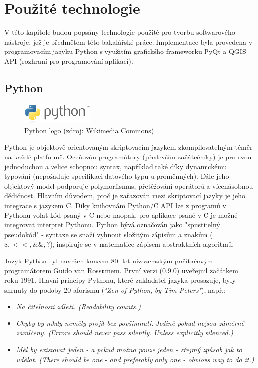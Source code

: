\chapter{Použité technologie}
\label{3-technologie}

V této kapitole budou popsány technologie použité pro tvorbu softwarového nástroje, jež je předmětem této bakalářské práce. Implementace byla provedena v programovacím jazyku Python s využitím grafického frameworku PyQt a QGIS API (rozhraní pro programování aplikací).  

\section{Python}
\begin{figure}[H]
    \centering
      \includegraphics[width=100pt]{./pictures/python.png}
      \caption[Python logo]{Python logo (zdroj: Wikimedia Commons)}
      \label{fig:python}
\end{figure}
  
Python je objektově orientovaným skriptovacím jazykem zkompilovatelným téměr na každé platformě. Oceňován programátory (především začátečníky) je pro svou jednoduchou a velice schopnou syntax, například také díky dynamickému typování (nepožaduje specifikaci datového typu u proměnných). Dále jeho objektový model podporuje polymorfismus, přetěžování operátorů a vícenásobnou dědičnost. Hlavním důvodem, proč je zařazován mezi skriptovací jazyky je jeho integrace s jazykem C. Díky knihovnám Python/C API lze z programů v Pythonu volat kód psaný v C nebo naopak, pro aplikace psané v C je možné integrovat interpret Pythonu. %
Python bývá označován jako "spustitelný pseudokód" - syntaxe se snaží vyhnout složitým zápisům a znakům ($\$, <<, \&\&, ?$), inspiruje se v matematice zápisem abstraktních algoritmů.%

Jazyk Python byl navržen koncem 80. let nizozemským počítačovým programátorem Guido van Rossumem. První verzi (0.9.0) uveřejnil začátkem roku 1991. Hlavní principy Pythonu, které zakladatel jazyka prosazuje, byly shrnuty do podoby 20 aforismů (\textit{"Zen of Python, by Tim Peters"}), např.:

\begin{itemize}

	\item
		\textit{Na čitelnosti záleží. (Readability counts.)} 	
			
	\item
		\textit{Chyby by nikdy neměly projít bez povšimnutí. Jedině pokud nejsou záměrně zamlčeny. (Errors should never pass silently. Unless explicitly silenced.)}
		
	\item
		\textit{Měl by existovat jeden - a pokud možno pouze jeden - zřejmý způsob jak to udělat. (There should be one - and preferably only one - obvious way to do it.)}
\end{itemize}  

